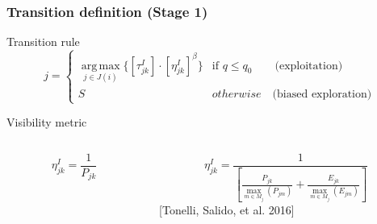 \begin{frame} \frametitle{Transition definition (Stage 1)} 

\begin{block} {Transition rule}
\begin{equation}\label{eq:acsTauStage1} 
j = 
\begin{cases} 
\displaystyle\operatorname*{arg\,max}_{j\in J(i)} \{ {[\tau_{jk}^{I}]\cdot[\eta_{jk}^{I}]^{\beta}} \} & \text{if } q\leq q_0 \quad\quad \text{(exploitation)} \\
S & otherwise \quad \text{(biased exploration)}
\end{cases}
\end{equation}
\end{block}

\begin{block}{Visibility metric}
\begin{columns}[c]
	\begin{column}[c]{6cm}
	\begin{equation} \label{eq:acsEta1Stage1}
	\eta_{jk}^{I} = \frac{1}{P_{jk}}
	\end{equation}	
	\end{column}
	\pause
	\begin{column}[c]{6cm}
	\begin{equation} \label{eq:acsEta2Stage1}
	\eta_{jk}^{I} = \frac{1}{
		\left[ \frac{P_{jk}}{\operatorname*{max}_{m\in M_{j}}(P_{jm})} +
		\frac{E_{jk}}{\operatorname*{max}_{m\in M_{j}}(E_{jm})}\right]}
	\end{equation}
	[Tonelli, Salido, et al. 2016]
	\end{column}
\end{columns}
\end{block}

\end{frame}


